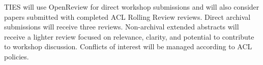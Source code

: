 \documentclass[11pt]{article}
\begin{document}
TIES will use OpenReview for direct workshop submissions and will also
consider papers submitted with completed ACL Rolling Review reviews.
Direct archival submissions will receive three reviews. Non-archival
extended abstracts will receive a lighter review focused on relevance,
clarity, and potential to contribute to workshop discussion. Conflicts
of interest will be managed according to ACL policies.







\end{document}
